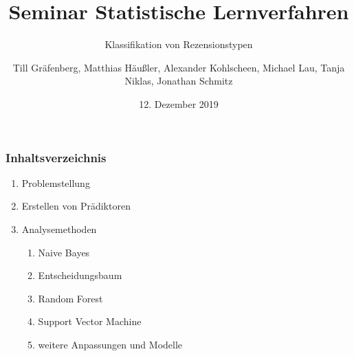 \documentclass{beamer}
\title{Seminar Statistische Lernverfahren}
\subtitle{Klassifikation von Rezensionstypen}
\author[T.G., M.H., A.K., M.L., T.N., J.S.]{Till Gräfenberg, Matthias Häußler, Alexander Kohlscheen, Michael Lau, Tanja Niklas, Jonathan Schmitz}
\date{12. Dezember 2019}
\begin{document}
\begin{frame}
\thispagestyle{empty}
\titlepage
\end{frame}
\begin{frame}
\addtocounter{framenumber}{-1}
\frametitle{Inhaltsverzeichnis}
\begin{enumerate}\itemsep10pt
\item Problemstellung
\item Erstellen von Prädiktoren
\item Analysemethoden
	\begin{enumerate}
	\item Naive Bayes
	\item Entscheidungsbaum
	\item Random Forest
	\item Support Vector Machine
	\item weitere Anpassungen und Modelle
	\end{enumerate}
\end{enumerate}
\end{frame}















\end{document}
